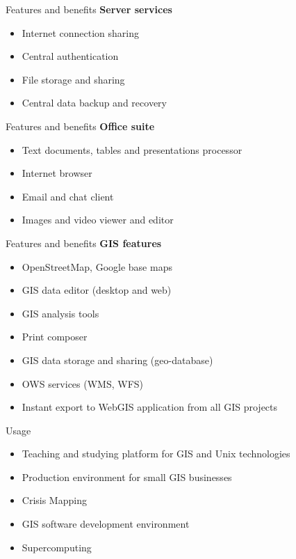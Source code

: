 \documentclass[12pt]{beamer}
\begin{document}
\begin{frame}{Features and benefits}
	\textbf{Server services}
	\begin{itemize}
		\item Internet connection sharing
		\item Central authentication
		\item File storage and sharing
		\item Central data backup and recovery
	\end{itemize}
\end{frame}


\begin{frame}{Features and benefits}
	\textbf{Office suite}
	\begin{itemize}
		\item Text documents, tables and presentations processor
		\item Internet browser
		\item Email and chat client
		\item Images and video viewer and editor
	\end{itemize}
\end{frame}


\begin{frame}{Features and benefits}
	\textbf{GIS features}
	\begin{itemize}
		\item OpenStreetMap, Google base maps
		\item GIS data editor (desktop and web)
		\item GIS analysis tools
		\item Print composer
		\item GIS data storage and sharing (geo-database)
		\item OWS services (WMS, WFS)
		\item Instant export to WebGIS application from all GIS projects
	\end{itemize}
\end{frame}


\begin{frame}{Usage}
	\begin{itemize}
		\item Teaching and studying platform for GIS and Unix technologies
		\item Production environment for small GIS businesses
		\item Crisis Mapping
		\item GIS software development environment
		\item Supercomputing
	\end{itemize}
\end{frame}
\end{document}
